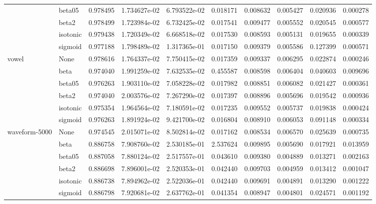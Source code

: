 \begin{tabular}{llrrrrrrrr}
        & beta05 &  0.978495 &  1.734627e-02 &  6.793522e-02 &   0.018171 &  0.008632 &  0.005427 &  0.020936 &  0.000278 \\
        & beta2 &  0.978499 &  1.723984e-02 &  6.732425e-02 &   0.017541 &  0.009477 &  0.005552 &  0.020545 &  0.000577 \\
        & isotonic &  0.979438 &  1.720349e-02 &  6.668518e-02 &   0.017530 &  0.008593 &  0.005131 &  0.019655 &  0.000339 \\
        & sigmoid &  0.977188 &  1.798489e-02 &  1.317365e-01 &   0.017150 &  0.009379 &  0.005586 &  0.127399 &  0.000571 \\
vowel & None &  0.978616 &  1.764337e-02 &  7.750415e-02 &   0.017359 &  0.009337 &  0.006295 &  0.022874 &  0.000246 \\
        & beta &  0.974040 &  1.991259e-02 &  7.632535e-02 &   0.455587 &  0.008598 &  0.006404 &  0.040603 &  0.009696 \\
        & beta05 &  0.976263 &  1.903110e-02 &  7.058228e-02 &   0.017982 &  0.008851 &  0.006082 &  0.021427 &  0.000361 \\
        & beta2 &  0.974040 &  2.003576e-02 &  7.267290e-02 &   0.017397 &  0.008896 &  0.005696 &  0.019542 &  0.000936 \\
        & isotonic &  0.975354 &  1.964564e-02 &  7.180591e-02 &   0.017235 &  0.009552 &  0.005737 &  0.019838 &  0.000424 \\
        & sigmoid &  0.976263 &  1.891924e-02 &  9.421700e-02 &   0.016804 &  0.008910 &  0.006053 &  0.091148 &  0.000334 \\
waveform-5000 & None &  0.974545 &  2.015071e-02 &  8.502814e-02 &   0.017162 &  0.008534 &  0.006570 &  0.025639 &  0.000735 \\
        & beta &  0.886758 &  7.908760e-02 &  2.530185e-01 &   2.537624 &  0.009895 &  0.005690 &  0.017921 &  0.013959 \\
        & beta05 &  0.887058 &  7.880124e-02 &  2.517557e-01 &   0.043610 &  0.009380 &  0.004889 &  0.013271 &  0.002163 \\
        & beta2 &  0.886698 &  7.896001e-02 &  2.520353e-01 &   0.042440 &  0.009703 &  0.004959 &  0.013412 &  0.001047 \\
        & isotonic &  0.886738 &  7.894962e-02 &  2.522036e-01 &   0.042440 &  0.009691 &  0.004891 &  0.013290 &  0.001222 \\
        & sigmoid &  0.886798 &  7.920681e-02 &  2.637762e-01 &   0.041354 &  0.008947 &  0.004801 &  0.024571 &  0.001192 \\

\end{tabular}
